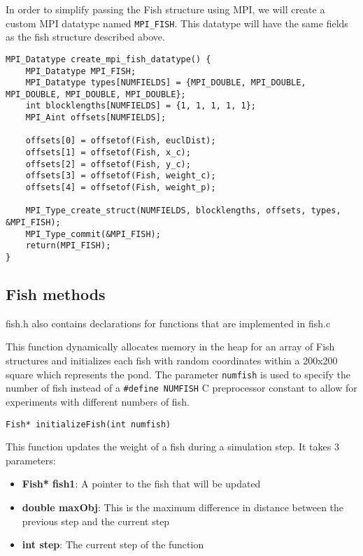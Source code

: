 \documentclass[
]{article}
\providecommand{\tightlist}{%
  \setlength{\itemsep}{0pt}\setlength{\parskip}{0pt}}
\begin{document}
In order to simplify passing the Fish structure using MPI, we will
create a custom MPI datatype named \texttt{MPI\_FISH}. This datatype
will have the same fields as the fish structure described above.

\begin{verbatim}
MPI_Datatype create_mpi_fish_datatype() {
    MPI_Datatype MPI_FISH;
    MPI_Datatype types[NUMFIELDS] = {MPI_DOUBLE, MPI_DOUBLE, MPI_DOUBLE, MPI_DOUBLE, MPI_DOUBLE};
    int blocklengths[NUMFIELDS] = {1, 1, 1, 1, 1};
    MPI_Aint offsets[NUMFIELDS];

    offsets[0] = offsetof(Fish, euclDist);
    offsets[1] = offsetof(Fish, x_c);
    offsets[2] = offsetof(Fish, y_c);
    offsets[3] = offsetof(Fish, weight_c);
    offsets[4] = offsetof(Fish, weight_p);

    MPI_Type_create_struct(NUMFIELDS, blocklengths, offsets, types, &MPI_FISH);
    MPI_Type_commit(&MPI_FISH);
    return(MPI_FISH);
}
\end{verbatim}

\hypertarget{fish-methods}{%
\subsection{Fish methods}\label{fish-methods}}

fish.h also contains declarations for functions that are implemented in
fish.c

This function dynamically allocates memory in the heap for an array of
Fish structures and initializes each fish with random coordinates within
a 200x200 square which represents the pond. The parameter
\texttt{numfish} is used to specify the number of fish instead of a
\texttt{\#define\ NUMFISH} C preprocessor constant to allow for
experiments with different numbers of fish.

\begin{verbatim}
Fish* initializeFish(int numfish)
\end{verbatim}

This function updates the weight of a fish during a simulation step. It
takes 3 parameters:

\begin{itemize}
\tightlist
\item
  \textbf{Fish* fish1}: A pointer to the fish that will be updated
\item
  \textbf{double maxObj}: This is the maximum difference in distance
  between the previous step and the current step
\item
  \textbf{int step}: The current step of the function
\end{itemize}
\end{document}
